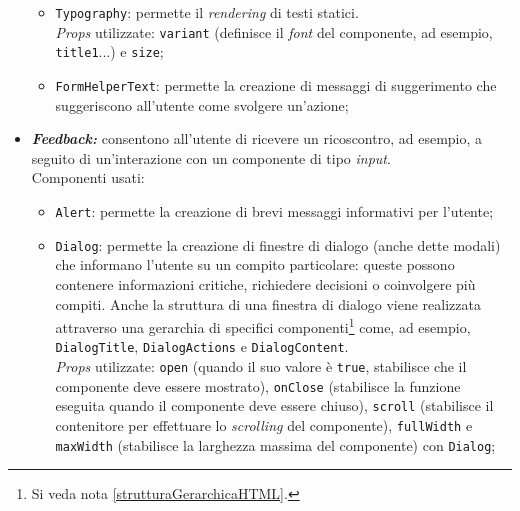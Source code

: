 \begin{itemize}
\begin{itemize}
      \item \texttt{Typography}: permette il \textit{rendering} di testi statici.\\
      \textit{Props} utilizzate: \texttt{variant} (definisce il \textit{font} del componente, ad esempio, \texttt{title1}...) e \texttt{size};

      \item \texttt{FormHelperText}: permette la creazione di messaggi di suggerimento che suggeriscono all'utente come svolgere un'azione;
    \end{itemize}

  \item \textbf{\textit{Feedback:}} consentono all'utente di ricevere un ricoscontro, ad esempio, a seguito di un'interazione con un componente di tipo \textit{input}.\\
  Componenti usati:
    \begin{itemize}
      \item \texttt{Alert}: permette la creazione di brevi messaggi informativi per l'utente;

      \item \texttt{Dialog}: permette la creazione di finestre di dialogo (anche dette modali) che informano l'utente su un compito particolare: queste possono contenere informazioni critiche, richiedere decisioni o coinvolgere più compiti. Anche la struttura di una finestra di dialogo viene realizzata attraverso una gerarchia di specifici componenti\footnote{Si veda nota \ref{strutturaGerarchicaHTML}.} come, ad esempio, \texttt{DialogTitle}, \texttt{DialogActions} e \texttt{DialogContent}.\\
      \textit{Props} utilizzate: \texttt{open} (quando il suo valore è \texttt{true}, stabilisce che il componente deve essere mostrato), \texttt{onClose} (stabilisce la funzione eseguita quando il componente deve essere chiuso), \texttt{scroll} (stabilisce il contenitore per effettuare lo \textit{scrolling} del componente), \texttt{fullWidth} e \texttt{maxWidth} (stabilisce la larghezza massima del componente) con \texttt{Dialog};
    \end{itemize}


\end{itemize}
